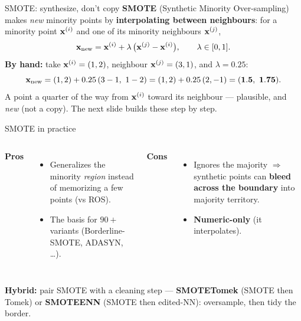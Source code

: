 \documentclass[aspectratio=169]{beamer}
\begin{document}
\begin{frame}{SMOTE: synthesize, don't copy}
  \textbf{SMOTE} (Synthetic Minority Over-sampling) makes \emph{new} minority points by
  \textbf{interpolating between neighbours}: for a minority point $\mathbf{x}^{(i)}$ and one of its
  minority neighbours $\mathbf{x}^{(j)}$,
  \[ \mathbf{x}_{\text{new}} = \mathbf{x}^{(i)} + \lambda\,\big(\mathbf{x}^{(j)} - \mathbf{x}^{(i)}\big), \qquad \lambda \in [0,1]. \]
  \vfill
  \textbf{By hand:} take $\mathbf{x}^{(i)}=(1,2)$, neighbour $\mathbf{x}^{(j)}=(3,1)$, and $\lambda=0.25$:
  \[ \xv_{\text{new}} = (1,2) + 0.25\,(3-1,\ 1-2) = (1,2) + 0.25\,(2,-1) = \mathbf{(1.5,\ 1.75)}. \]
  \vfill
  \footnotesize A point a quarter of the way from $\mathbf{x}^{(i)}$ toward its neighbour --- plausible,
  and \emph{new} (not a copy). The next slide builds these step by step.
\end{frame}


\begin{frame}{SMOTE in practice}
  \begin{columns}[T]
    \textcolor{paramgreen}{\textbf{Pros}}
    \begin{itemize}\small
      \item Generalizes the minority \emph{region} instead of memorizing a few points (vs ROS).
      \item The basis for $90{+}$ variants (Borderline-SMOTE, ADASYN, \dots).
    \end{itemize}
    \textcolor{armred}{\textbf{Cons}}
    \begin{itemize}\small
      \item Ignores the majority $\Rightarrow$ synthetic points can \textbf{bleed across the
        boundary} into majority territory.
      \item \textbf{Numeric-only} (it interpolates).
    \end{itemize}
  \end{columns}
  \vskip 4pt
  \footnotesize \textbf{Hybrid:} pair SMOTE with a cleaning step --- \textbf{SMOTETomek} (SMOTE
  then Tomek) or \textbf{SMOTEENN} (SMOTE then edited-NN): oversample, then tidy the border.
  \vfill
\end{frame}
\end{document}
